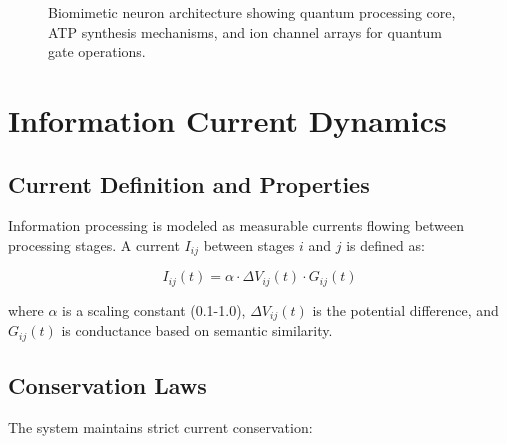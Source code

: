 \documentclass[12pt,a4paper]{article}
\begin{document}
\begin{figure}[H]
\centering
{}
\caption{Biomimetic neuron architecture showing quantum processing core, ATP synthesis mechanisms, and ion channel arrays for quantum gate operations.}
\label{fig:neuron_arch}
\end{figure}

\section{Information Current Dynamics}

\subsection{Current Definition and Properties}

Information processing is modeled as measurable currents flowing between processing stages. A current $I_{ij}$ between stages $i$ and $j$ is defined as:

\begin{equation}
I_{ij}(t) = \alpha \cdot \Delta V_{ij}(t) \cdot G_{ij}(t)
\label{eq:current_def}
\end{equation}

where $\alpha$ is a scaling constant (0.1-1.0), $\Delta V_{ij}(t)$ is the potential difference, and $G_{ij}(t)$ is conductance based on semantic similarity.

\subsection{Conservation Laws}

The system maintains strict current conservation:
\end{document}

